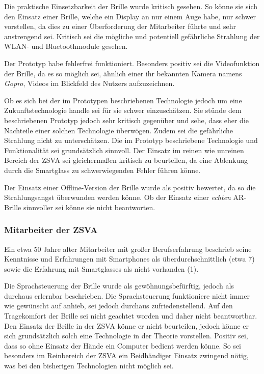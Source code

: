 Die praktische Einsetzbarkeit der Brille wurde kritisch gesehen. So könne sie sich den Einsatz einer Brille, welche ein Display an nur einem Auge habe, nur schwer vorstellen, da dies zu einer Überforderung der Mitarbeiter führte und sehr anstrengend sei. Kritisch sei die mögliche und potentiell gefährliche Strahlung der WLAN- und Bluetoothmodule gesehen.

Der Prototyp habe fehlerfrei funktioniert. Besonders positiv sei die Videofunktion der Brille, da es so möglich sei, ähnlich einer ihr bekannten Kamera namens \emph{Gopro}, Videos im Blickfeld des Nutzers aufzuzeichnen. 

Ob es sich bei der im Prototypen beschriebenen Technologie jedoch um eine Zukunftstechnologie handle sei für sie schwer einzuschätzen. Sie stünde dem beschriebenen Prototyp jedoch sehr kritisch gegenüber und sehe, dass eher die Nachteile einer solchen Technologie überwögen. Zudem sei die gefährliche Strahlung nicht zu unterschätzen. Die im Prototyp beschriebene Technologie und Funktionalität sei grundsätzlich sinnvoll. Der Einsatz im reinen wie unreinen Bereich der ZSVA sei gleichermaßen kritisch zu beurteilen, da eine Ablenkung durch die Smartglass zu schwerwiegenden Fehler führen könne.

Der Einsatz einer Offline-Version der Brille wurde als positiv bewertet, da so die Strahlungsangst überwunden werden könne. Ob der Einsatz einer \emph{echten} AR-Brille sinnvoller sei könne sie nicht beantworten.
%
\subsubsection{Mitarbeiter der ZSVA}
%
Ein etwa 50 Jahre alter Mitarbeiter mit großer Berufserfahrung beschrieb seine Kenntnisse und Erfahrungen mit Smartphones als überdurchschnittlich (etwa 7) sowie die Erfahrung mit Smartglasses als nicht vorhanden (1).

Die Sprachsteuerung der Brille wurde als gewöhnungsbefürftig, jedoch als durchaus erlernbar beschrieben. Die Sprachsteuerung funktioniere nicht immer wie gewünscht auf anhieb, sei jedoch durchaus zufriedenstellend. Auf den Tragekomfort der Brille sei nicht geachtet worden und daher nicht beantwortbar. Den Einsatz der Brille in der ZSVA könne er nicht beurteilen, jedoch könne er sich grundsätzlich solch eine Technologie in der Theorie vorstellen. Positiv sei, dass so ohne Einsatz der Hände ein Computer bedient werden könne. So sei besonders im Reinbereich der ZSVA ein Beidhändiger Einsatz zwingend nötig, was bei den bisherigen Technologien nicht möglich sei. 

